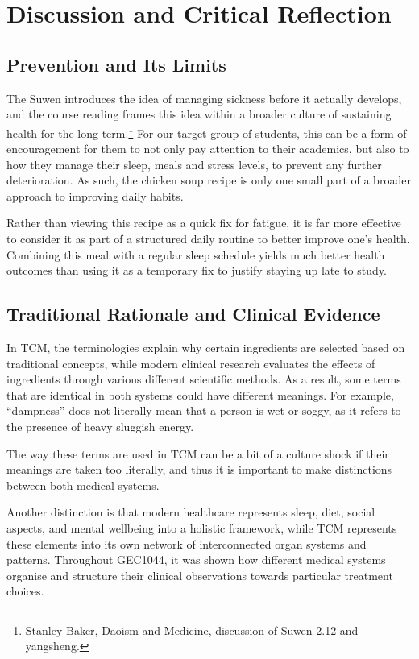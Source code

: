 \documentclass[12pt,a4paper]{article}
\begin{document}
\section{Discussion and Critical Reflection}
\subsection{Prevention and Its Limits}
The Suwen introduces the idea of managing sickness before it actually develops, and the course reading frames this idea within a broader culture of sustaining health for the long-term.\footnote{Stanley-Baker, Daoism and Medicine, discussion of Suwen 2.12 and yangsheng.} For our target group of students, this can be a form of encouragement for them to not only pay attention to their academics, but also to how they manage their sleep, meals and stress levels, to prevent any further deterioration. As such, the chicken soup recipe is only one small part of a broader approach to improving daily habits.

Rather than viewing this recipe as a quick fix for fatigue, it is far more effective to consider it as part of a structured daily routine to better improve one's health. Combining this meal with a regular sleep schedule yields much better health outcomes than using it as a temporary fix to justify staying up late to study.


\subsection{Traditional Rationale and Clinical Evidence}
In TCM, the terminologies explain why certain ingredients are selected based on traditional concepts, while modern clinical research evaluates the effects of ingredients through various different scientific methods. As a result, some terms that are identical in both systems could have different meanings. For example, “dampness” does not literally mean that a person is wet or soggy, as it refers to the presence of heavy sluggish energy.

The way these terms are used in TCM can be a bit of a culture shock if their meanings are taken too literally, and thus it is important to make distinctions between both medical systems.

Another distinction is that modern healthcare represents sleep, diet, social aspects, and mental wellbeing into a holistic framework, while TCM represents these elements into its own network of interconnected organ systems and patterns. Throughout GEC1044, it was shown how different medical systems organise and structure their clinical observations towards particular treatment choices.
\end{document}
